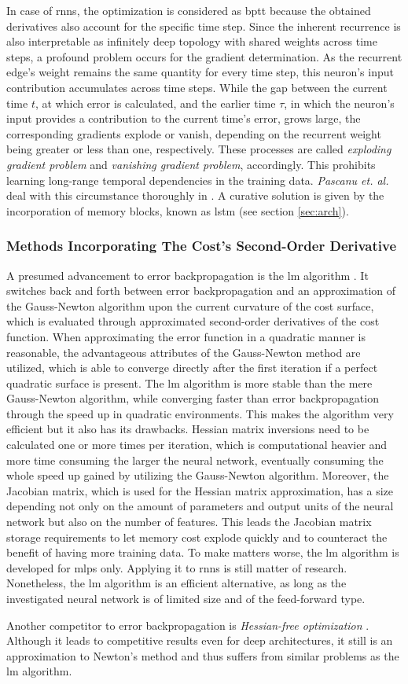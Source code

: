 In case of \glspl{rnn}, the optimization is considered as \gls{bptt} because the obtained derivatives also account for the specific time step.
Since the inherent recurrence is also interpretable as infinitely deep topology with shared weights across time steps, a profound problem occurs for the gradient determination.
As the recurrent edge's weight remains the same quantity for every time step, this neuron's input contribution accumulates across time steps.
While the gap between the current time $t$, at which error is calculated, and the earlier time $\tau$, in which the neuron's input provides a contribution to the current time's error, grows large, the corresponding gradients explode or vanish, depending on the recurrent weight being greater or less than one, respectively.
These processes are called \textit{exploding gradient problem} and \textit{vanishing gradient problem}, accordingly.
This prohibits learning long-range temporal dependencies in the training data.
\textit{Pascanu et. al.} deal with this circumstance thoroughly in \cite{PaMi2012}.
A curative solution is given by the incorporation of memory blocks, known as \gls{lstm} (see section \ref{sec:arch}). 

\subsubsection{Methods Incorporating The Cost's Second-Order Derivative}
A presumed advancement to error backpropagation  is the \gls{lm} algorithm \cite{YuWi2011}.
It switches back and forth between error backpropagation and an approximation of the Gauss-Newton algorithm upon the current curvature of the cost surface, which is evaluated through approximated second-order derivatives of the cost function.
When approximating the error function in a quadratic manner is reasonable, the advantageous attributes of the Gauss-Newton method are utilized, which is able to converge directly after the first iteration if a perfect quadratic surface is present.
The \gls{lm} algorithm is more stable than the mere Gauss-Newton algorithm, while converging faster than error backpropagation through the speed up in quadratic environments.
This makes the algorithm very efficient but it also has its drawbacks.
Hessian matrix inversions need to be calculated one or more times per iteration, which is computational heavier and more time consuming the larger the neural network, eventually consuming the whole speed up gained by utilizing the Gauss-Newton algorithm.
Moreover, the Jacobian matrix, which is used for the Hessian matrix approximation, has a size depending not only on the amount of parameters and output units of the neural network but also on the number of features.
This leads the Jacobian matrix storage requirements to let memory cost explode quickly and to counteract the benefit of having more training data.
To make matters worse, the \gls{lm} algorithm is developed for \glspl{mlp} only.
Applying it to \glspl{rnn} is still matter of research.
Nonetheless, the \gls{lm} algorithm is an efficient alternative, as long as the investigated neural network is of limited size and of the feed-forward type.

Another competitor to error backpropagation is \textit{Hessian-free optimization} \cite{Martens2010, SuMa2013}.
Although it leads to competitive results even for deep architectures, it still is an approximation to Newton's method and thus suffers from similar problems as the \gls{lm} algorithm.

